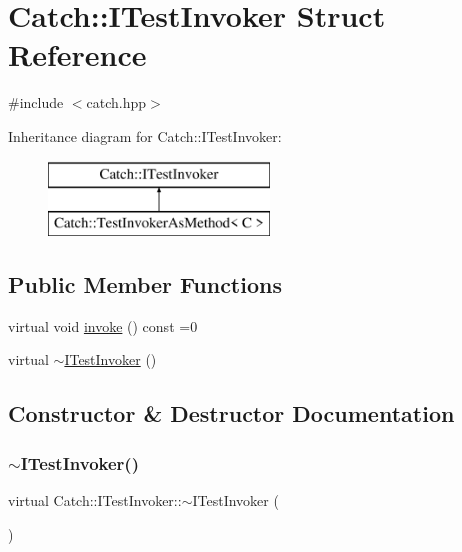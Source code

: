 \hypertarget{struct_catch_1_1_i_test_invoker}{}\section{Catch\+:\+:I\+Test\+Invoker Struct Reference}
\label{struct_catch_1_1_i_test_invoker}


{\ttfamily \#include $<$catch.\+hpp$>$}

Inheritance diagram for Catch\+:\+:I\+Test\+Invoker\+:\begin{figure}[H]
\begin{center}
\leavevmode
\includegraphics[height=2.000000cm]{struct_catch_1_1_i_test_invoker}
\end{center}
\end{figure}
\subsection*{Public Member Functions}
\begin{DoxyCompactItemize}
\item 
virtual void \mbox{\hyperlink{struct_catch_1_1_i_test_invoker_a6fcd5c5b67d6d5ade6491ff33411ca7f}{invoke}} () const =0
\item 
virtual \mbox{\hyperlink{struct_catch_1_1_i_test_invoker_a2c89f3eece5b1b677243766e409bd831}{$\sim$\+I\+Test\+Invoker}} ()
\end{DoxyCompactItemize}


\subsection{Constructor \& Destructor Documentation}
\mbox{\label{struct_catch_1_1_i_test_invoker_a2c89f3eece5b1b677243766e409bd831}} 
\subsubsection{\texorpdfstring{$\sim$\+I\+Test\+Invoker()}{~ITestInvoker()}}
{\footnotesize\ttfamily virtual Catch\+::\+I\+Test\+Invoker\+::$\sim$\+I\+Test\+Invoker (\begin{DoxyParamCaption}{ }\end{DoxyParamCaption})\hspace{0.3cm}{\ttfamily [virtual]}}



